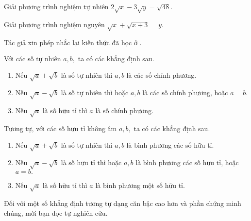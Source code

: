 \begin{gbtt}
Giải phương trình nghiệm tự nhiên $2\sqrt{x}-3\sqrt{y}=\sqrt{48}.$
\end{gbtt}

\begin{gbtt}
Giải phương trình nghiệm nguyên $\sqrt{x}+\sqrt{x+3}=y.$
\end{gbtt}

Tác giả xin phép nhắc lại kiến thức đã học ở . 
\begin{light}
Với các số tự nhiên $a,b,$ ta có các khẳng định sau.
\begin{enumerate}
    \item Nếu $\sqrt{a}+\sqrt{b}$ là số tự nhiên thì $a,b$ là các số chính phương.
    \item Nếu $\sqrt{a}-\sqrt{b}$ là số tự nhiên thì hoặc $a,b$ là các số chính phương, hoặc $a=b.$
    \item Nếu $\sqrt{a}$ là số hữu tỉ thì $a$ là số chính phương.  
\end{enumerate}    
Tương tự, với các số hữu tỉ không âm $a,b,$ ta có các khẳng định sau.
\begin{enumerate}
    \item Nếu $\sqrt{a}+\sqrt{b}$ là số tự nhiên thì $a,b$ là bình phương các số hữu tỉ.
    \item Nếu $\sqrt{a}-\sqrt{b}$ là số hữu tỉ thì hoặc $a,b$ là bình phương các số hữu tỉ, hoặc $a=b.$
    \item Nếu $\sqrt{a}$ là số hữu tỉ thì $a$ là bình phương một số hữu tỉ.     \end{enumerate}
Đối với một số khẳng định tương tự dạng căn bậc cao hơn và phần chứng minh chúng, mời bạn đọc tự nghiên cứu.
 \end{light}
 
